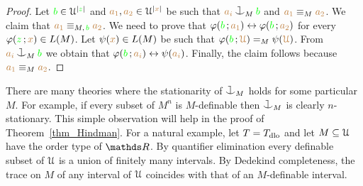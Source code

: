 \documentclass[creche.tex]{subfiles}
\begin{document}
\begin{proof}
Let  ${\color{green} b}\in\EuScript U^{|{\color{green} z}|}$ and ${\color{brown} a_1},{\color{brown} a_2}\in\EuScript U^{|{\color{brown} x}|}$ 
be such that ${\mr a_i}\cnonfork_M{\gr b}$ and ${\color{brown} a_1}\equiv_M{\color{brown} a_2}$.
We claim that ${\color{brown} a_1}\equiv_{M,\,{\color{green} b}}{\color{brown} a_2}$.
We need to prove that $\varphi({\color{green} b}\,;{\color{brown} a_1})\leftrightarrow\varphi({\color{green} b}\,;{\color{brown} a_2})$ 
for every  $\varphi({\color{green} z}\,;{\color{brown} x})\in L(M)$.
Let $\psi({\color{brown} x})\in L(M)$ be such that $\varphi({\color{green} b}\,;{\color{brown} \EuScript U})=_M\psi({\color{brown} \EuScript U})$.
From ${\mr a_i}\cnonfork_M{\gr b}$ we obtain that  $\varphi({\color{green} b}\,;{\color{brown} a_i})\leftrightarrow\psi({\color{brown} a_i})$.
Finally, the claim follows because ${\color{brown} a_1}\equiv_M{\color{brown} a_2}$.
\end{proof}



% 


\begin{remark}\label{rk_coheir_stationary}
There are many theories where the stationarity of $\cnonfork_M$ holds for some particular $M$.
For example, if every subset of $M^n$ is $M$-definable then $\cnonfork_M$ is clearly $n$-stationary.
This simple observation will help in the proof of Theorem~\ref{thm_Hindman}.
For a natural example, let $T=T_{\rm dlo}$ and let $M\subseteq\EuScript U$ have the order type of $\RR$.
By quantifier elimination every definable subset of $\EuScript U$ is a union of finitely many intervals.
By Dedekind completeness, the trace on $M$ of any interval of $\EuScript U$ coincides with that of an $M$-definable interval. 
\end{remark}
\end{document}
